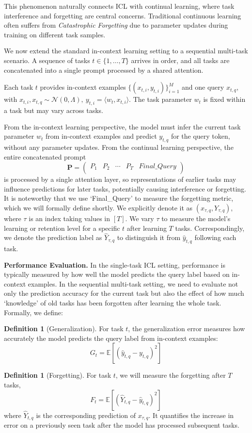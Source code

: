 \documentclass{article}
\theoremstyle{plain}
\theoremstyle{definition}
\newtheorem{definition}[theorem]{Definition}
\theoremstyle{remark}
\begin{document}
This phenomenon naturally connects ICL with continual learning, where task interference and forgetting are central concerns. Traditional continuous learning often suffers from \emph{Catastrophic Forgetting} due to parameter updates during training on different task samples. 

We now extend the standard in-context learning setting to a sequential multi-task scenario. A sequence of tasks $t\in\{1,\dots,T\}$ arrives in order, and all tasks are concatenated into a single prompt processed by a shared attention.

Each task $t$ provides in-context examples $\{(x_{t,i},y_{t,i})\}_{i=1}^M$ and one query $x_{t,q}$, with $x_{t,i}, x_{t,q}\sim\mathcal N(0,\Lambda),\:y_{t,i}=\langle w_t,x_{t,i}\rangle$. The task parameter $w_t$ is fixed within a task but may vary across tasks.

From the in-context learning perspective, the model must infer the current task parameter $w_t$ from in-context examples and predict $y_{t,q}$ for the query token, without any parameter updates. From the continual learning perspective, the entire concatenated prompt
\[
\textbf{P}= \begin{pmatrix}
    P_1 & P_2 & \cdots & P_T & Final\_Query\\
\end{pmatrix}
\]
is processed by a single attention layer, so representations of earlier tasks may influence predictions for later tasks, potentially causing interference or forgetting. It is noteworthy that we use ‘Final\_Query’ to measure the forgetting metric, which we will formally define shortly. We explicitly denote it as $(x_{\tau,q},Y_{\tau,q})$, where $\tau$ is an index taking values in $[T]$. We vary $\tau$ to measure the model's learning or retention level for a specific $t$ after learning $T$ tasks. Correspondingly, we denote the prediction label as $\hat{Y}_{\tau,q}$ to distinguish it from $\hat{y}_{t,q}$ following each task.

\textbf{Performance Evaluation.}
\label{performance_defination}
In the single-task ICL setting, performance is typically measured by how well the model predicts the query label based on in-context examples. In the sequential multi-task setting, we need to evaluate not only the prediction accuracy for the current task but also the effect of how much ‘knowledge’ of old tasks has been forgotten after learning the whole task. Formally, we define:

\begin{definition}[Generalization]
    For task $t$, the generalization error measures how accurately the model predicts the query label from in-context examples:
    \[
    G_t = \mathbb{E}[(\hat y_{t,q}-y_{t,q})^2]
    \]
\end{definition}
\begin{definition}[Forgetting]
    For task $t$, we will measure the forgetting after $T$ tasks,
    \[
    F_t = \mathbb{E}[(\hat{Y}_{t,q}-\hat y_{t,q})^2]
    \]
    where $\hat{Y}_{t,q}$ is the corresponding prediction of $x_{\tau,q}$. It quantifies the increase in error on a previously seen task after the model has processed subsequent tasks.
\end{definition}
\end{document}
